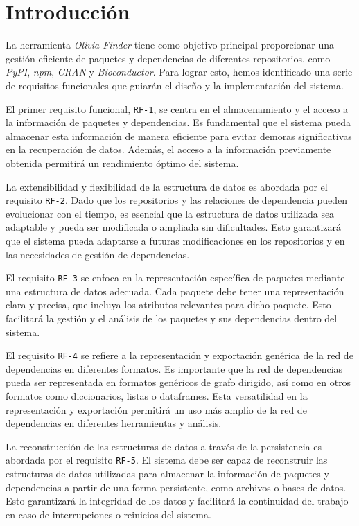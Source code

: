 
\section{Introducción}
La herramienta \textit{Olivia Finder} tiene como objetivo principal proporcionar
una gestión eficiente de paquetes y dependencias de diferentes repositorios, como
\textit{PyPI}, \textit{npm}, \textit{CRAN} y \textit{Bioconductor}. Para lograr esto,
hemos identificado una serie de requisitos funcionales que guiarán el diseño y la
implementación del sistema.

El primer requisito funcional, \texttt{RF-1}, se centra en el almacenamiento 
y el acceso a la información de paquetes y dependencias. Es fundamental que el
sistema pueda almacenar esta información de manera eficiente para evitar demoras
significativas en la recuperación de datos. Además, el acceso a la información previamente obtenida
permitirá un rendimiento óptimo del sistema.

La extensibilidad y flexibilidad de la estructura de datos es abordada por el
requisito \texttt{RF-2}. Dado que los repositorios y las relaciones de dependencia
pueden evolucionar con el tiempo, es esencial que la estructura de datos utilizada sea
adaptable y pueda ser modificada o ampliada sin dificultades. Esto garantizará que el
sistema pueda adaptarse a futuras modificaciones en los repositorios y en las necesidades
de gestión de dependencias.

El requisito \texttt{RF-3} se enfoca en la representación específica de paquetes mediante
una estructura de datos adecuada. Cada paquete debe tener una representación clara y
precisa, que incluya los atributos relevantes para dicho paquete. Esto facilitará la
gestión y el análisis de los paquetes y sus dependencias dentro del sistema.

El requisito \texttt{RF-4} se refiere a la representación y exportación genérica de la
red de dependencias en diferentes formatos. Es importante que la red de dependencias
pueda ser representada en formatos genéricos de grafo dirigido, así como en otros formatos
como diccionarios, listas o dataframes. Esta versatilidad en la representación y exportación
permitirá un uso más amplio de la red de dependencias en diferentes herramientas y análisis.

La reconstrucción de las estructuras de datos a través de la persistencia es abordada por
el requisito \texttt{RF-5}. El sistema debe ser capaz de reconstruir las estructuras de
datos utilizadas para almacenar la información de paquetes y dependencias a partir de una
forma persistente, como archivos o bases de datos. Esto garantizará la integridad de
los datos y facilitará la continuidad del trabajo en caso de interrupciones o reinicios del sistema.

